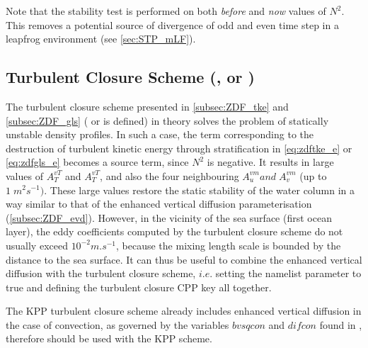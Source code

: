 \documentclass[../tex_main/NEMO_manual]{subfiles}
\begin{document}
Note that the stability test is performed on both \textit{before} and \textit{now} 
values of $N^2$. This removes a potential source of divergence of odd and
even time step in a leapfrog environment \citep{Leclair_PhD2010} (see \autoref{sec:STP_mLF}).

\subsection[Turbulent closure scheme (\protect\key{zdf}\{tke,gls,osm\})]{Turbulent Closure Scheme (\protect{}, \protect{} or \protect{})}
\label{subsec:ZDF_tcs}

The turbulent closure scheme presented in \autoref{subsec:ZDF_tke} and \autoref{subsec:ZDF_gls} 
( or  is defined) in theory solves the problem of statically 
unstable density profiles. In such a case, the term corresponding to the 
destruction of turbulent kinetic energy through stratification in \autoref{eq:zdftke_e} 
or \autoref{eq:zdfgls_e} becomes a source term, since $N^2$ is negative. 
It results in large values of $A_T^{vT}$ and  $A_T^{vT}$, and also the four neighbouring 
$A_u^{vm} {and}\;A_v^{vm}$ (up to $1\;m^2s^{-1})$. These large values 
restore the static stability of the water column in a way similar to that of the 
enhanced vertical diffusion parameterisation (\autoref{subsec:ZDF_evd}). However, 
in the vicinity of the sea surface (first ocean layer), the eddy coefficients 
computed by the turbulent closure scheme do not usually exceed $10^{-2}m.s^{-1}$, 
because the mixing length scale is bounded by the distance to the sea surface. 
It can thus be useful to combine the enhanced vertical 
diffusion with the turbulent closure scheme, $i.e.$ setting the  
namelist parameter to true and defining the turbulent closure CPP key all together.

The KPP turbulent closure scheme already includes enhanced vertical diffusion 
in the case of convection, as governed by the variables $bvsqcon$ and $difcon$ 
found in , therefore  should be used with the KPP 
scheme. %

\end{document}
